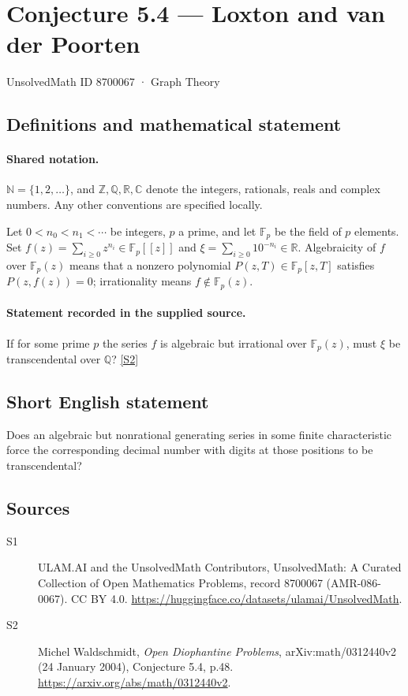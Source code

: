 \documentclass[11pt]{article}
\newcommand{\sref}[2]{\hyperlink{source:#1:#2}{[S#2]}}
\begin{document}
\setcounter{section}{8700066}
\section{Conjecture 5.4 — Loxton and van der Poorten}\label{8700067}
{\small\sffamily UnsolvedMath ID 8700067 · Graph Theory}
\subsection{Definitions and mathematical statement}

\paragraph{Shared notation.}$\mathbb N=\{1,2,\ldots\}$, and $\mathbb Z,\mathbb Q,\mathbb R,\mathbb C$ denote the integers, rationals, reals and complex numbers. Any other conventions are specified locally.


Let $0<n_0<n_1<\cdots$ be integers, $p$ a prime, and let $\mathbb F_p$ be the field of $p$ elements. Set $f(z)=\sum_{i\ge0}z^{n_i}\in\mathbb F_p[[z]]$ and $\xi=\sum_{i\ge0}10^{-n_i}\in\mathbb R$. Algebraicity of $f$ over $\mathbb F_p(z)$ means that a nonzero polynomial $P(z,T)\in\mathbb F_p[z,T]$ satisfies $P(z,f(z))=0$; irrationality means $f\notin\mathbb F_p(z)$.
\paragraph{Statement recorded in the supplied source.}
If for some prime $p$ the series $f$ is algebraic but irrational over $\mathbb F_p(z)$, must $\xi$ be transcendental over $\mathbb Q$? \sref{8700067}{2}

\subsection{Short English statement}
Does an algebraic but nonrational generating series in some finite characteristic force the corresponding decimal number with digits at those positions to be transcendental?
\subsection{Sources}
\begin{description}
\item[\hypertarget{source:8700067:1}{S1}] ULAM.AI and the UnsolvedMath Contributors, UnsolvedMath: A Curated Collection of Open Mathematics Problems, record 8700067 (AMR-086-0067). CC BY 4.0. \url{https://huggingface.co/datasets/ulamai/UnsolvedMath}.
\item[\hypertarget{source:8700067:2}{S2}] Michel Waldschmidt, \emph{Open Diophantine Problems}, arXiv:math/0312440v2 (24 January 2004), Conjecture 5.4, p.48. \url{https://arxiv.org/abs/math/0312440v2}.
\end{description}
\label{end:8700067}
\end{document}
